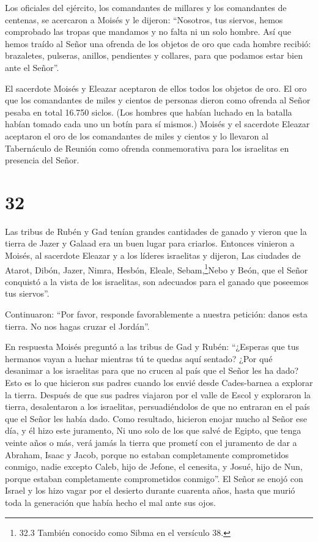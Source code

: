  Los oficiales del ejército, los comandantes de millares y
los comandantes de centenas, se acercaron a Moisés  y le
dijeron: ``Nosotros, tus siervos, hemos comprobado las tropas que
mandamos y no falta ni un solo hombre.  Así que hemos
traído al Señor una ofrenda de los objetos de oro que cada hombre
recibió: brazaletes, pulseras, anillos, pendientes y collares, para que
podamos estar bien ante el Señor''.

 El sacerdote Moisés y Eleazar aceptaron de ellos todos los
objetos de oro.  El oro que los comandantes de miles y
cientos de personas dieron como ofrenda al Señor pesaba en total 16.750
siclos.  (Los hombres que habían luchado en la batalla
habían tomado cada uno un botín para sí mismos.)  Moisés y
el sacerdote Eleazar aceptaron el oro de los comandantes de miles y
cientos y lo llevaron al Tabernáculo de Reunión como ofrenda
conmemorativa para los israelitas en presencia del Señor.

\hypertarget{section-31}{%
\section{32}\label{section-31}}

 Las tribus de Rubén y Gad tenían grandes cantidades de
ganado y vieron que la tierra de Jazer y Galaad era un buen lugar para
criarlos.  Entonces vinieron a Moisés, al sacerdote Eleazar
y a los líderes israelitas y dijeron,  Las ciudades de
Atarot, Dibón, Jazer, Nimra, Hesbón, Eleale, Sebam,\footnote{32.3
  También conocido como Sibma en el versículo 38.}Nebo y Beón,
 que el Señor conquistó a la vista de los israelitas, son
adecuados para el ganado que poseemos tus siervos''.

 Continuaron: ``Por favor, responde favorablemente a nuestra
petición: danos esta tierra. No nos hagas cruzar el Jordán''.

 En respuesta Moisés preguntó a las tribus de Gad y Rubén:
``¿Esperas que tus hermanos vayan a luchar mientras tú te quedas aquí
sentado?  ¿Por qué desanimar a los israelitas para que no
crucen al país que el Señor les ha dado?  Esto es lo que
hicieron sus padres cuando los envié desde Cades-barnea a explorar la
tierra.  Después de que sus padres viajaron por el valle de
Escol y exploraron la tierra, desalentaron a los israelitas,
persuadiéndolos de que no entraran en el país que el Señor les había
dado.  Como resultado, hicieron enojar mucho al Señor ese
día, y él hizo este juramento,  Ni uno solo de los que
salvé de Egipto, que tenga veinte años o más, verá jamás la tierra que
prometí con el juramento de dar a Abraham, Isaac y Jacob, porque no
estaban completamente comprometidos conmigo,  nadie excepto
Caleb, hijo de Jefone, el cenesita, y Josué, hijo de Nun, porque estaban
completamente comprometidos conmigo''.  El Señor se enojó
con Israel y los hizo vagar por el desierto durante cuarenta años, hasta
que murió toda la generación que había hecho el mal ante sus ojos.

